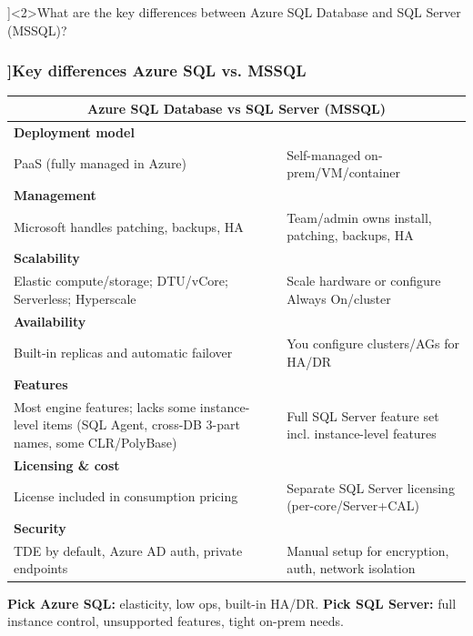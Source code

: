 \QuestionSlide[\CategoryBadge[MicroColor!20]{Azure SQL}]<2>{What are the key differences between Azure SQL Database and SQL Server (MSSQL)?}

\begin{frame}[fragile]
\frametitle{\AnswerTitle[\CategoryBadge[MicroColor!20]{Azure SQL}]{Key differences Azure SQL vs. MSSQL}}

{\scriptsize
\setlength{\tabcolsep}{3pt}%
\renewcommand{\arraystretch}{1.15}%
\begin{tabular}{|p{.48\linewidth}|p{.48\linewidth}|}
\hline
\multicolumn{2}{|c|}{\textbf{Azure SQL Database} \quad vs \quad \textbf{SQL Server (MSSQL)}}\\
\hline

\multicolumn{2}{|l|}{\textbf{Deployment model}}\\ \hline
PaaS (fully managed in Azure) & Self-managed on-prem/VM/container \\ \hline

\multicolumn{2}{|l|}{\textbf{Management}}\\ \hline
Microsoft handles patching, backups, HA & Team/admin owns install, patching, backups, HA \\ \hline

\multicolumn{2}{|l|}{\textbf{Scalability}}\\ \hline
Elastic compute/storage; DTU/vCore; Serverless; Hyperscale & Scale hardware or configure Always On/cluster \\ \hline

\multicolumn{2}{|l|}{\textbf{Availability}}\\ \hline
Built-in replicas and automatic failover & You configure clusters/AGs for HA/DR \\ \hline

\multicolumn{2}{|l|}{\textbf{Features}}\\ \hline
Most engine features; lacks some instance-level items (SQL Agent, cross-DB 3-part names, some CLR/PolyBase) & Full SQL Server feature set incl. instance-level features \\ \hline

\multicolumn{2}{|l|}{\textbf{Licensing \& cost}}\\ \hline
License included in consumption pricing & Separate SQL Server licensing (per-core/Server+CAL) \\ \hline

\multicolumn{2}{|l|}{\textbf{Security}}\\ \hline
TDE by default, Azure AD auth, private endpoints & Manual setup for encryption, auth, network isolation \\ \hline
\end{tabular}

\vspace{0.6em}
\textbf{Pick Azure SQL:} elasticity, low ops, built-in HA/DR.\quad
\textbf{Pick SQL Server:} full instance control, unsupported features, tight on-prem needs.
} %

\end{frame}


